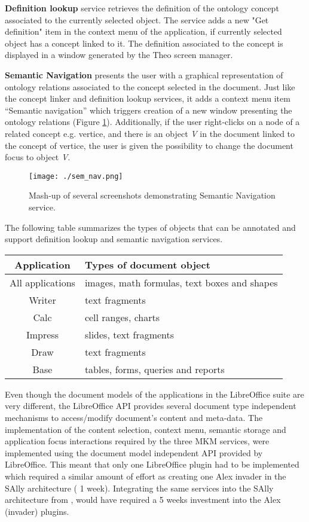 \documentclass{llncs}
\begin{document}
\textbf{Definition lookup} service retrieves the definition of the ontology concept associated to the currently selected object. The service adds a new "Get definition" item in the context menu of the application, if currently selected object has a concept linked to it. The definition associated to the concept is displayed in a window generated by the Theo screen manager. 

\textbf{Semantic Navigation} presents the user with a graphical representation of ontology relations associated to the concept selected in the document. Just like the concept linker and definition lookup services, it adds a context menu item ``Semantic navigation'' which triggers creation of a new window presenting the ontology relations (Figure \ref{fig:sem_nav}). Additionally, if the user right-clicks on a node of a related concept e.g. vertice, and there is an object \textit{V} in the document linked to the concept of vertice, the user is given the possibility to change the document focus to object \textit{V}. 

\begin{figure}
\centering
\texttt{[image: ./sem\_nav.png]}
\caption{Mash-up of several screenshots demonstrating Semantic Navigation service. }
\label{fig:sem_nav}
\end{figure}

The following table summarizes the types of objects that can be annotated and support definition lookup and semantic navigation services.
\begin{center}
\begin{tabular}{|c|p{9cm}|}
\hline Application & Types of document object\\ 
\hline All applications & images, math formulas, text boxes and shapes \\
\hline Writer & text fragments \\ 
\hline Calc & cell ranges, charts \\ 
\hline Impress & slides, text fragments \\ 
\hline Draw & text fragments \\
\hline Base & tables, forms, queries and reports\\
\hline 
\end{tabular} 
\end{center} 

Even though the document models of the applications in the LibreOffice suite are very different, the LibreOffice API provides several document type independent mechanisms to access/modify document's content and meta-data. The implementation of the content selection, context menu, semantic storage and application focus  interactions required by the three MKM services, were implemented using the document model independent API provided by LibreOffice. This meant that only one LibreOffice plugin had to be implemented which required a similar amount of effort as creating one Alex invader in the SAlly architecture ( 1 week). Integrating the same services into the SAlly architecture from \cite{DavJucKoh:safusa12}, would have required a 5 weeks investment into the Alex (invader) plugins. 
\end{document}

